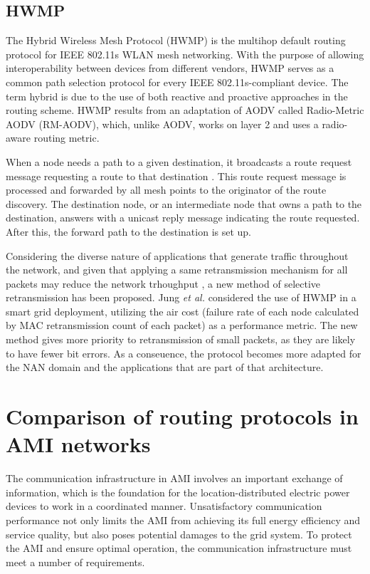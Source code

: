 \documentclass[11pt,draftclsnofoot,onecolumn]{IEEEtran}
\begin{document}
\subsection{HWMP}\label{hwmp}

The Hybrid Wireless Mesh Protocol (HWMP) is the multihop default routing protocol for IEEE 802.11s WLAN mesh networking. With the purpose of allowing interoperability between devices from different vendors, HWMP serves as a common path selection protocol for every IEEE 802.11s-compliant device. The term hybrid is due to the use of both reactive and proactive approaches in the routing scheme. HWMP results from an adaptation of AODV called Radio-Metric AODV (RM-AODV), which, unlike AODV, works on layer 2 and uses a radio-aware routing metric. 

When a node needs a path to a given destination, it broadcasts a route request message requesting a route to that destination \cite{Bahr2006}. This route request message is processed and forwarded by all mesh points to the originator of the route discovery. The destination node, or an intermediate node that owns a path to the destination, answers with a unicast reply message indicating the route requested. After this, the forward path to the destination is set up. 

Considering the diverse nature of applications that generate traffic throughout the network, and given that applying a same retransmission mechanism for all packets may reduce the network trhoughput \cite{Meng2014}, a new method of selective retransmission has been proposed. Jung \textit{et al.} \cite{Jung2011} considered the use of HWMP in a smart grid deployment, utilizing the air cost (failure rate of each node calculated by MAC retransmission count of each packet) as a performance metric. The new method gives more priority to retransmission of small packets, as they are likely to have fewer bit errors. As a conseuence, the protocol becomes more adapted for the NAN domain and the applications that are part of that architecture. 


\section{Comparison of routing protocols in AMI networks}\label{metrics}

The communication infrastructure in AMI involves an important exchange of information, which is the foundation for the location-distributed electric power devices to work in a coordinated manner. Unsatisfactory communication performance not only limits the AMI from achieving its full energy efficiency and service quality, but also poses potential damages to the grid system. To protect the AMI and ensure optimal operation, the communication infrastructure must meet a number of requirements.
\end{document}
